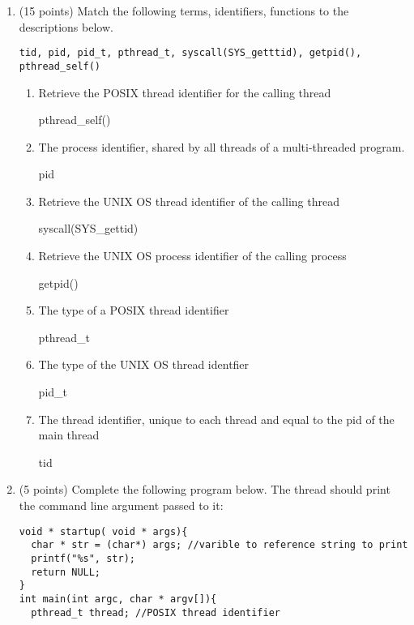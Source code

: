 \documentclass{article}[9pt]
\newenvironment{answerfont}{\fontfamily{qhv}\selectfont}{\par}
\newenvironment{myanswer}{\begin{mdframed}\begin{answerfont}}{\end{answerfont}\end{mdframed}}
\begin{document}
\begin{enumerate}
\item (15 points) Match the following terms, identifiers, functions to the descriptions below.
\begin{verbatim}
tid, pid, pid_t, pthread_t, syscall(SYS_getttid), getpid(), pthread_self()
\end{verbatim}
\begin{enumerate}

  \item Retrieve the POSIX thread identifier for the calling thread
    \begin{myanswer}
      pthread\_self()
    \end{myanswer}
  \item The process identifier, shared by all threads of a multi-threaded program.
    \begin{myanswer}
      pid
    \end{myanswer}
  \item Retrieve the UNIX OS thread identifier of the calling thread
    \begin{myanswer}
      syscall(SYS\_gettid)
    \end{myanswer}
  \item Retrieve the UNIX OS process identifier of the calling process
    \begin{myanswer}
      getpid()
    \end{myanswer}
  \item The type of a POSIX thread identifier
    \begin{myanswer}
      pthread\_t
    \end{myanswer}
  \item The type of the UNIX OS thread identfier
    \begin{myanswer}
      pid\_t
    \end{myanswer}
  \item The thread identifier, unique to each thread and equal to the pid of the main thread
    \begin{myanswer}
      tid
    \end{myanswer}
\end{enumerate}


\item (5 points) Complete the following program below. The thread should print the command line argument passed to it:
  \begin{verbatim}
void * startup( void * args){
  char * str = (char*) args; //varible to reference string to print
  printf("%s", str);
  return NULL;
}
int main(int argc, char * argv[]){
  pthread_t thread; //POSIX thread identifier


\end{verbatim}
\end{enumerate}
\end{document}
